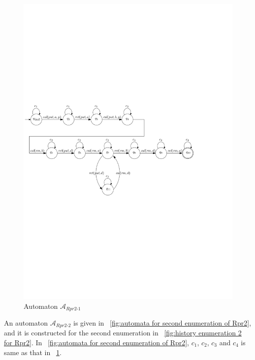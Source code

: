 \begin{figure}[htbp]
  \centering
  \includegraphics[width=0.8 \textwidth]{PIC_AUTO_Rpr2_1.pdf}
  \caption{Automaton $\mathcal{A}_{\textit{Rpr2-1}}$}
  \label{fig:automata for first enumeration of Rpr2}
\end{figure}


An automaton $\mathcal{A}_{\textit{Rpr2-2}}$ is given in \figurename~\ref{fig:automata for second enumeration of Rpr2}, and it is constructed for the second enumeration in \figurename~\ref{fig:history enumeration 2 for Rpr2}. In \figurename~\ref{fig:automata for second enumeration of Rpr2}, $c_1$, $c_2$, $c_3$ and $c_4$ is same as that in \figurename~\ref{fig:automata for first enumeration of Rpr2}.

